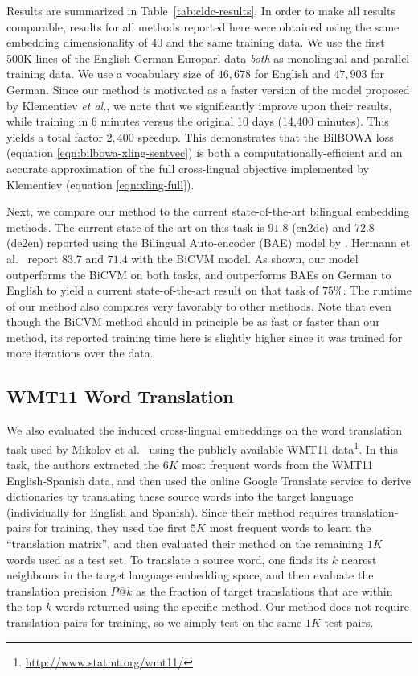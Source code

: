 \documentclass[10pt]{article}
\begin{document}
Results are summarized in Table~\ref{tab:cldc-results}. In order to make all
results comparable, results for all methods reported here were obtained using
the same embedding dimensionality of $40$ and the same training data.  We use
the first 500K lines of the English-German Europarl data \emph{both} as
monolingual and parallel training data. We use a vocabulary size of $46,678$
for English and $47,903$ for German. Since our method is motivated as a faster
version of the model proposed by Klementiev \emph{et al.}, we note that we 
significantly improve upon their results, while
training in $6$ minutes versus the original 10 days (14,400 minutes). This yields a
total factor $2,400$ speedup. This demonstrates that the BilBOWA loss 
(equation \ref{eqn:bilbowa-xling-sentvec}) is both a
computationally-efficient and an accurate approximation of the full cross-lingual
objective implemented by Klementiev (equation \ref{eqn:xling-full}).

Next, we compare our method to the current state-of-the-art bilingual embedding
methods.  The current state-of-the-art on this task is $91.8$ (en2de) and
$72.8$ (de2en) reported using the Bilingual Auto-encoder (BAE) model by
\cite{chandar2014autoencoder}. Hermann et al.~\cite{hermann2013multilingual}
report $83.7$ and $71.4$ with the BiCVM model. As shown, our model outperforms
the BiCVM on both tasks, and outperforms BAEs on German to English to yield a
current state-of-the-art result on that task of $75$\%. The runtime of our
method also compares very favorably to other methods. Note that even though the
BiCVM method should in principle be as fast or faster than our method, its
reported training time here is slightly higher since it was trained for more iterations
over the data.

\subsection{WMT11 Word Translation}
\label{sec:wmt}

We also evaluated the induced cross-lingual embeddings on the word
translation task used by Mikolov et al.~\cite{mikolov2013exploiting} using the
publicly-available WMT11 data\footnote{\url{http://www.statmt.org/wmt11/}}. 
In this task, the authors extracted the $6K$ most frequent words from the WMT11
English-Spanish data, and then used the online Google Translate service to
derive dictionaries by translating these source words into the target language
(individually for English and Spanish).  Since their method requires
translation-pairs for training, they used the first $5K$ most frequent words to
learn the ``translation matrix'', and then evaluated their method on the
remaining $1K$ words used as a test set. To translate a source word, one finds
its $k$ nearest neighbours in the target language embedding space, and then
evaluate the translation precision $P@k$ as the fraction of target translations
that are within the top-$k$ words returned using the specific method.  Our
method does not require translation-pairs for training, so we simply test on
the same $1K$ test-pairs.
\end{document}
